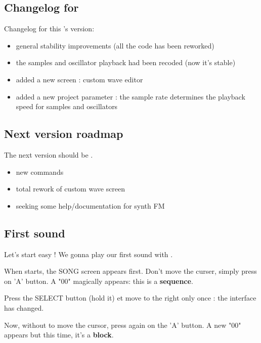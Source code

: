 \subsection{Changelog for \fatversion}

Changelog for this \FAT's version: \medskip
\begin{itemize}
  \item{general stability improvements (all the code has been reworked)}
  \item{the samples and oscillator playback had been recoded (now it's stable)}
  \item{added a new screen : custom wave editor}
  \item{added a new project parameter : the sample rate determines the playback speed for samples and oscillators}
\end{itemize}

\subsection{Next version roadmap}

The next version should be \fatnextversion. \medskip
\begin{itemize}
    \item{new commands}
    \item{total rework of custom wave screen}
    \item{seeking some help/documentation for synth FM}
\end{itemize}

\subsection{First sound}

Let's start easy ! We gonna play our first sound with \FAT.\medskip

When \FAT starts, the SONG screen appears first. Don't move the curser, simply press on 'A' button.
A "00" magically appears: this is a {\bf sequence}.


Press the SELECT button (hold it) et move to the right only once : the interface has changed.


Now, without to move the cursor, press again on the 'A' button. A new "00" appears but this time, it's a {\bf block}.


